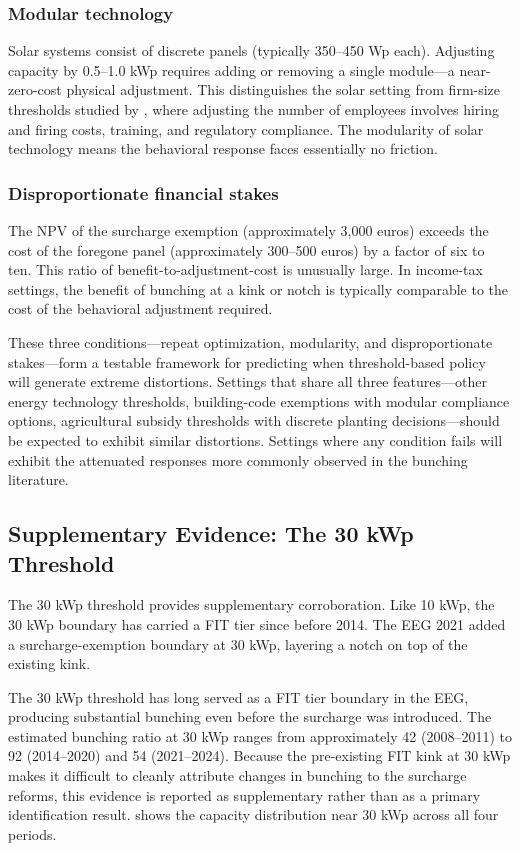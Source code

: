 \documentclass[12pt]{article}
\begin{document}
\subsubsection*{Modular technology} Solar systems consist of discrete panels (typically 350--450 Wp each). Adjusting capacity by 0.5--1.0 kWp requires adding or removing a single module---a near-zero-cost physical adjustment. This distinguishes the solar setting from firm-size thresholds studied by \citet{garicano2016firm}, where adjusting the number of employees involves hiring and firing costs, training, and regulatory compliance. The modularity of solar technology means the behavioral response faces essentially no friction.

\subsubsection*{Disproportionate financial stakes} The NPV of the surcharge exemption (approximately 3,000 euros) exceeds the cost of the foregone panel (approximately 300--500 euros) by a factor of six to ten. This ratio of benefit-to-adjustment-cost is unusually large. In income-tax settings, the benefit of bunching at a kink or notch is typically comparable to the cost of the behavioral adjustment required.

These three conditions---repeat optimization, modularity, and disproportionate stakes---form a testable framework for predicting when threshold-based policy will generate extreme distortions. Settings that share all three features---other energy technology thresholds, building-code exemptions with modular compliance options, agricultural subsidy thresholds with discrete planting decisions---should be expected to exhibit similar distortions. Settings where any condition fails will exhibit the attenuated responses more commonly observed in the bunching literature.

\subsection{Supplementary Evidence: The 30 kWp Threshold}

The 30 kWp threshold provides supplementary corroboration. Like 10 kWp, the 30 kWp boundary has carried a FIT tier since before 2014. The EEG 2021 added a surcharge-exemption boundary at 30 kWp, layering a notch on top of the existing kink.

The 30 kWp threshold has long served as a FIT tier boundary in the EEG, producing substantial bunching even before the surcharge was introduced. The estimated bunching ratio at 30 kWp ranges from approximately 42 (2008--2011) to 92 (2014--2020) and 54 (2021--2024). Because the pre-existing FIT kink at 30 kWp makes it difficult to cleanly attribute changes in bunching to the surcharge reforms, this evidence is reported as supplementary rather than as a primary identification result.  shows the capacity distribution near 30 kWp across all four periods.
\end{document}
